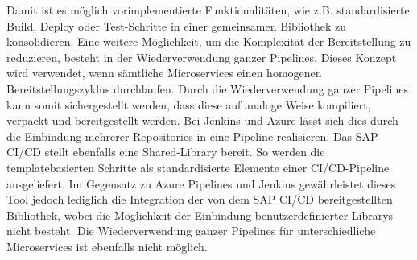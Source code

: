  Damit ist es möglich vorimplementierte Funktionalitäten, wie z.B. standardisierte Build, Deploy oder Test-Schritte in einer gemeinsamen Bibliothek zu konsolidieren. Eine weitere Möglichkeit, um die Komplexität der Bereitstellung zu reduzieren, besteht in der Wiederverwendung ganzer Pipelines. Dieses Konzept wird verwendet, wenn sämtliche Microservices einen homogenen Bereitstellungszyklus durchlaufen. Durch die Wiederverwendung ganzer Pipelines kann somit sichergestellt werden, dass diese auf analoge Weise kompiliert, verpackt und bereitgestellt werden. Bei Jenkins und Azure lässt sich dies durch die Einbindung mehrerer Repositories in eine Pipeline realisieren. Das SAP CI/CD stellt ebenfalls eine Shared-Library bereit. So werden die templatebasierten Schritte als standardisierte Elemente einer CI/CD-Pipeline ausgeliefert. Im Gegensatz zu Azure Pipelines und Jenkins gewährleistet dieses Tool jedoch lediglich die Integration der von dem SAP CI/CD bereitgestellten Bibliothek, wobei die Möglichkeit der Einbindung benutzerdefinierter Librarys nicht besteht. Die Wiederverwendung ganzer Pipelines für unterschiedliche Microservices ist ebenfalls nicht möglich.
